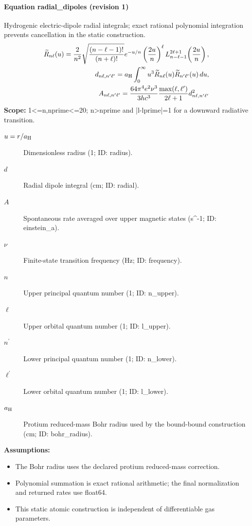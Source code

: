 \paragraph{Equation radial\_dipoles (revision 1)}
Hydrogenic electric-dipole radial integrals; exact rational polynomial integration prevents cancellation in the static construction.
\begin{equation}
\begin{aligned}
\widetilde R_{n\ell}(u)=\frac{2}{n^2}\sqrt{\frac{(n-\ell-1)!}{(n+\ell)!}}e^{-u/n}\left(\frac{2u}{n}\right)^\ell L_{n-\ell-1}^{2\ell+1}\!\left(\frac{2u}{n}\right),\\ d_{n\ell,n^\prime\ell^\prime}=a_{\rm H}\int_0^\infty u^3\widetilde R_{n\ell}(u)\widetilde R_{n^\prime\ell^\prime}(u)\,du,\\ A_{n\ell,n^\prime\ell^\prime}=\frac{64\pi^4 e^2\nu^3}{3hc^3}\frac{\max(\ell,\ell^\prime)}{2\ell+1}d^2_{n\ell,n^\prime\ell^\prime}
\end{aligned}
\label{eq:escape.atom_5f_convergence:radial_5f_dipoles:1}
\end{equation}
\noindent\textbf{Scope:} 1<=n,nprime<=20; n>nprime and |l-lprime|=1 for a downward radiative transition.

\begin{description}
\item[$u=r/a_{\rm H}$] Dimensionless radius (1; ID: radius).
\item[$d$] Radial dipole integral (cm; ID: radial).
\item[$A$] Spontaneous rate averaged over upper magnetic states (s\textasciicircum{}-1; ID: einstein\_a).
\item[$\nu$] Finite-state transition frequency (Hz; ID: frequency).
\item[$n$] Upper principal quantum number (1; ID: n\_upper).
\item[$\ell$] Upper orbital quantum number (1; ID: l\_upper).
\item[$n^\prime$] Lower principal quantum number (1; ID: n\_lower).
\item[$\ell^\prime$] Lower orbital quantum number (1; ID: l\_lower).
\item[$a_{\rm H}$] Protium reduced-mass Bohr radius used by the bound-bound construction (cm; ID: bohr\_radius).
\end{description}

\noindent\textbf{Assumptions:}
\begin{itemize}
\item The Bohr radius uses the declared protium reduced-mass correction.
\item Polynomial summation is exact rational arithmetic; the final normalization and returned rates use float64.
\item This static atomic construction is independent of differentiable gas parameters.
\end{itemize}

